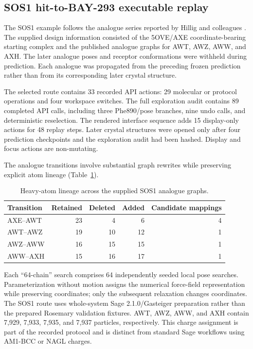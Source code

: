 \documentclass[11pt]{article}
\begin{document}
\begin{small}
\subsection{SOS1 hit-to-BAY-293 executable replay}

The SOS1 example follows the analogue series reported by Hillig and colleagues \citep{hillig2019sos1}. The supplied design information consisted of the 5OVE/AXE coordinate-bearing starting complex and the published analogue graphs for AWT, AWZ, AWW, and AXH. The later analogue poses and receptor conformations were withheld during prediction. Each analogue was propagated from the preceding frozen prediction rather than from its corresponding later crystal structure.

The selected route contains 33 recorded API actions: 29 molecular or protocol operations and four workspace switches. The full exploration audit contains 89 completed API calls, including three Phe890/pose branches, nine undo calls, and deterministic reselection. The rendered interface sequence adds 15 display-only actions for 48 replay steps. Later crystal structures were opened only after four prediction checkpoints and the exploration audit had been hashed. Display and focus actions are non-mutating.

The analogue transitions involve substantial graph rewrites while preserving explicit atom lineage (Table~\ref{tab:appA_lineage}).

\begin{table}[htbp]
\centering\small
\caption{Heavy-atom lineage across the supplied SOS1 analogue graphs.}
\label{tab:appA_lineage}
\begin{tabular}{@{}lrrrr@{}}
\toprule
\textbf{Transition} & \textbf{Retained} & \textbf{Deleted} & \textbf{Added} & \textbf{Candidate mappings}\\
\midrule
AXE--AWT & 23 & 4 & 6 & 4\\
AWT--AWZ & 19 & 10 & 12 & 1\\
AWZ--AWW & 16 & 15 & 15 & 1\\
AWW--AXH & 15 & 16 & 17 & 1\\
\bottomrule
\end{tabular}
\end{table}

Each ``64-chain'' search comprises 64 independently seeded local pose searches. Parameterization without motion assigns the numerical force-field representation while preserving coordinates; only the subsequent relaxation changes coordinates. The SOS1 route uses whole-system Sage 2.1.0/Gasteiger preparation rather than the prepared Rosemary validation fixtures. AWT, AWZ, AWW, and AXH contain 7,929, 7,933, 7,935, and 7,937 particles, respectively. This charge assignment is part of the recorded protocol and is distinct from standard Sage workflows using AM1-BCC or NAGL charges.


\end{small}
\end{document}
